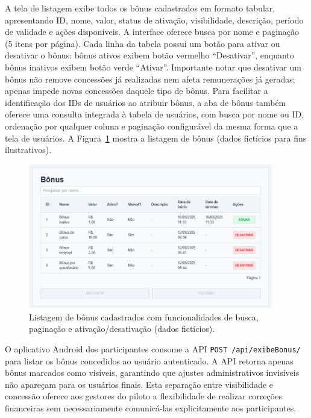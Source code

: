 A tela de listagem exibe todos os bônus
cadastrados em formato tabular, apresentando ID, nome, valor, status de ativação,
visibilidade, descrição, período de validade e ações disponíveis. A interface
oferece busca por nome e paginação (5 itens por página). Cada linha da tabela
possui um botão para ativar ou desativar o bônus: bônus ativos exibem
botão vermelho ``Desativar'', enquanto bônus inativos exibem botão verde
``Ativar''. Importante notar que desativar um bônus não remove concessões já
realizadas nem afeta remunerações já geradas; apenas impede novas concessões
daquele tipo de bônus. Para facilitar a identificação dos IDs de usuários ao
atribuir bônus, a aba de bônus também oferece uma consulta integrada à tabela de
usuários, com busca por nome ou ID, ordenação por qualquer coluna e
paginação configurável da mesma forma que a tela de usuários. A Figura~\ref{fig:bonus_listagem_form} mostra a listagem de bônus (dados fictícios para fins ilustrativos).

\begin{figure}[H]
    \centering
    \includegraphics[width=0.95\textwidth]{figuras/bonus_listar.PNG}
    \caption{Listagem de bônus cadastrados com funcionalidades de busca, paginação e ativação/desativação (dados fictícios).}
    \label{fig:bonus_listagem_form}
  \end{figure}
 

O aplicativo Android dos participantes
consome a API \texttt{POST /api/exibeBonus/} para listar os bônus concedidos ao
usuário autenticado. A API retorna apenas bônus marcados como visíveis, garantindo que ajustes administrativos invisíveis não
apareçam para os usuários finais. Esta separação entre visibilidade e concessão
oferece aos gestores do piloto a flexibilidade de realizar correções financeiras
sem necessariamente comunicá-las explicitamente aos participantes.

